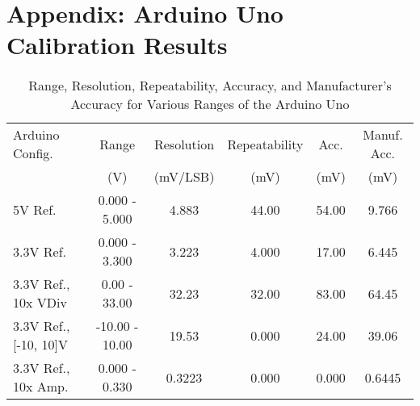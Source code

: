 \section{Appendix: Arduino Uno Calibration Results}
\label{sec:appendix-arduino-calibration}
\begin{table}[ht]
    \caption{Range, Resolution, Repeatability, Accuracy, and Manufacturer's Accuracy for Various Ranges of the Arduino Uno}
    \label{tab:arduino-accuracy}
    \centering
    \small
    \begin{tabular}{lccccc}
        \toprule
        Arduino Config. & Range & Resolution & Repeatability & Acc. & Manuf. Acc. \\
        & (V) & (mV/LSB) & (mV) & (mV) & (mV) \\
        \midrule
        5V Ref. & 0.000 - 5.000 & 4.883 & 44.00 & 54.00 & 9.766 \\
        3.3V Ref. & 0.000 - 3.300 & 3.223 & 4.000 & 17.00 & 6.445 \\
        3.3V Ref., 10x VDiv & 0.00 - 33.00 & 32.23 & 32.00 & 83.00 & 64.45 \\
        3.3V Ref., [-10, 10]V & -10.00 - 10.00 & 19.53 & 0.000 & 24.00 & 39.06 \\
        3.3V Ref., 10x Amp. & 0.000 - 0.330 & 0.3223 & 0.000 & 0.000 & 0.6445 \\
        \bottomrule
    \end{tabular}
\end{table}
